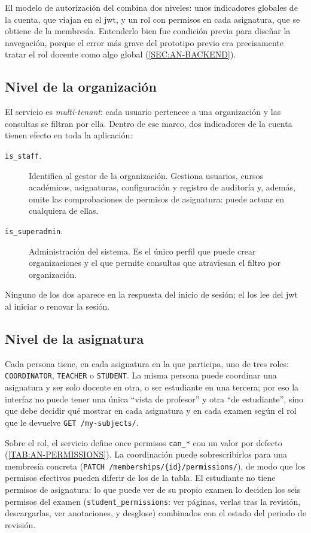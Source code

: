 El modelo de autorización del  combina dos niveles: unos indicadores globales
de la cuenta, que viajan en el \acs{jwt}, y un rol con permisos en cada asignatura, que se
obtiene de la membresía. Entenderlo bien fue condición previa para diseñar la navegación,
porque el error más grave del prototipo previo era precisamente tratar el rol docente como
algo global (\cref{SEC:AN-BACKEND}).

\subsection{Nivel de la organización}

El servicio es \textit{multi-tenant}: cada usuario pertenece a una organización y las
consultas se filtran por ella. Dentro de ese marco, dos indicadores de la cuenta tienen
efecto en toda la aplicación:
\begin{description}
  \item[\texttt{is\_staff}.] Identifica al gestor de la organización. Gestiona usuarios,
        cursos académicos, asignaturas, configuración y registro de auditoría y, además,
        omite las comprobaciones de permisos de asignatura: puede actuar en cualquiera de
        ellas.
  \item[\texttt{is\_superadmin}.] Administración del sistema. Es el único perfil que puede
        crear organizaciones y el que permite consultas que atraviesan el filtro por
        organización.
\end{description}
Ninguno de los dos aparece en la respuesta del inicio de sesión; el  los lee
del \acs{jwt} al iniciar o renovar la sesión.

\subsection{Nivel de la asignatura}

Cada persona tiene, en cada asignatura en la que participa, uno de tres roles:
\texttt{COORDINATOR}, \texttt{TEACHER} o \texttt{STUDENT}. La misma persona puede coordinar
una asignatura y ser solo docente en otra, o ser estudiante en una tercera; por eso la
interfaz no puede tener una única ``vista de profesor'' y otra ``de estudiante'', sino que
debe decidir qué mostrar en cada asignatura y en cada examen según el rol que le devuelve
\texttt{GET /my-subjects/}.

Sobre el rol, el servicio define once permisos \texttt{can\_*} con un valor por defecto
(\cref{TAB:AN-PERMISSIONS}). La coordinación puede sobrescribirlos para una membresía
concreta (\texttt{PATCH /memberships/\{id\}/permissions/}), de modo que los permisos
efectivos pueden diferir de los de la tabla. El estudiante no tiene permisos de asignatura:
lo que puede ver de su propio examen lo deciden los seis permisos del examen
(\texttt{student\_permissions}: ver páginas, verlas tras la revisión, descargarlas, ver
anotaciones,  y desglose) combinados con el estado del periodo de revisión.

